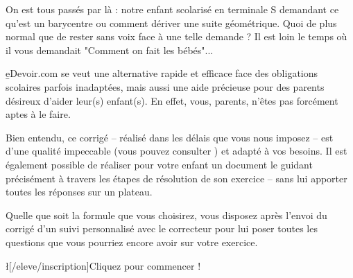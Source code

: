 On est tous passés par là : notre enfant scolarisé en terminale S demandant ce qu'est un barycentre ou comment dériver une suite géométrique. Quoi de plus normal que de rester sans voix face à une telle demande ? Il est loin le temps où il vous demandait "Comment on fait les bébés"...

\b{eDevoir.com} se veut une alternative rapide et efficace face des obligations scolaires parfois inadaptées, mais aussi une aide précieuse pour des parents désireux d'aider leur(s) enfant(s). En effet, vous, parents, n'êtes pas forcément aptes à le faire.

Bien entendu, ce corrigé -- réalisé dans les délais que vous nous imposez -- est d'une qualité impeccable (vous pouvez consulter ) et adapté à vos besoins. Il est également possible de réaliser pour votre enfant un document le guidant précisément à travers les étapes de résolution de son exercice -- sans lui apporter toutes les réponses sur un plateau.

Quelle que soit la formule que vous choisirez, vous disposez après l'envoi du corrigé d'un suivi personnalisé avec le correcteur pour lui poser toutes les questions que vous pourriez encore avoir sur votre exercice.

\l[/eleve/inscription]{Cliquez pour commencer !}